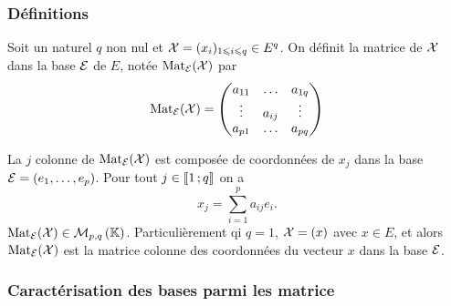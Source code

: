 \subsubsection{Définitions}

\begin{defdef}
  Soit un naturel \(q\) non nul et \(\mathcal{X}=(x_i)_{1 \leqslant i \leqslant q} \in E^q\). On définit la matrice de \(\mathcal{X}\) dans la base \(\mathcal{E}\) de \(E\), notée \(\mathrm{Mat}_{\mathcal{E}}(\mathcal{X})\) par
  \begin{equation}
    \mathrm{Mat}_{\mathcal{E}}(\mathcal{X}) =
    \begin{pmatrix}
      a_{11} & \ldots & a_{1q} \\
      \vdots & a_{ij} & \vdots \\
      a_{p1} & \ldots & a_{pq}
    \end{pmatrix}
  \end{equation}

  La \(j\)\ieme{} colonne de \(\mathrm{Mat}_{\mathcal{E}}(\mathcal{X})\) est composée de coordonnées de \(x_j\) dans la base \(\mathcal{E}=(e_1, \ldots, e_p)\). Pour tout \(j \in \mathopen{\llbracket}1\mathclose{}\mathpunct{};q\mathclose{\rrbracket}\) on a
  \begin{equation}
    x_j = \sum_{i=1}^p a_{ij}e_i.
  \end{equation}
  \(\mathrm{Mat}_{\mathcal{E}}(\mathcal{X}) \in \mathcal{M}_{p,q}\left(\mathbb{K}\right)\). Particulièrement qi \(q=1\), \(\mathcal{X}=(x)\) avec \(x \in E\), et alors \(\mathrm{Mat}_{\mathcal{E}}(\mathcal{X})\) est la matrice colonne des coordonnées du vecteur \(x\) dans la base \(\mathcal{E}\).
\end{defdef}

\subsubsection{Caractérisation des bases parmi les matrice}

